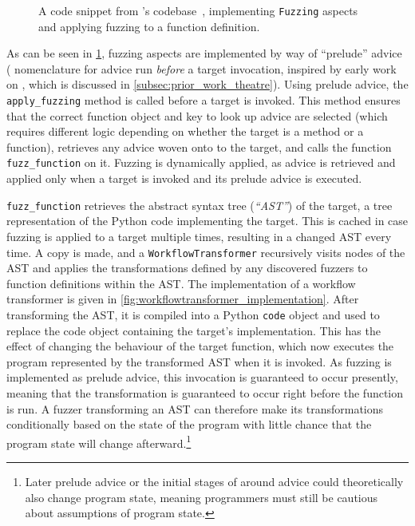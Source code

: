 \begin{figure}
    \centering
    
    \caption{A code snippet from \pydysofu's codebase~\cite{pdsf_repo},
    implementing \lstinline{Fuzzing} aspects and applying fuzzing to a function
    definition.}
    \label{fig:v1_pdsf_fuzzing_impl_codesnippet}
\end{figure}

As can be seen in \cref{fig:v1_pdsf_fuzzing_impl_codesnippet}, fuzzing aspects
are implemented by way of ``prelude'' advice (\pydysofu{} nomenclature for advice
run \emph{before} a target invocation, inspired by early work on \theatreag{},
which is discussed in \cref{subsec:prior_work_theatre}). Using prelude advice,
the \lstinline{apply_fuzzing} method is called before a target is invoked. This
method ensures that the correct function object and key to look up advice are
selected (which requires different logic depending on whether the target is a
method or a function), retrieves any advice woven onto to the target, and calls
the function \lstinline{fuzz_function} on it. Fuzzing is dynamically applied, as
advice is retrieved and applied only when a target is invoked and its prelude
advice is executed.

\lstinline{fuzz_function} retrieves the abstract syntax tree
(\emph{``AST''}) of the target, a tree representation of the Python code
implementing the target. This is cached in case fuzzing is applied to a target
multiple times, resulting in a changed AST every time. A copy is made, and a
\lstinline{WorkflowTransformer} recursively visits nodes of the AST and applies
the transformations defined by any discovered fuzzers to function definitions
within the AST. The implementation of a workflow transformer is given in
\cref{fig:workflowtransformer_implementation}. After transforming the AST, it is
compiled into a Python \lstinline{code} object and used to replace the code
object containing the target's implementation. This has the effect of changing
the behaviour of the target function, which now executes the program represented
by the transformed AST when it is invoked. As fuzzing is implemented as prelude
advice, this invocation is guaranteed to occur presently, meaning that the
transformation is guaranteed to occur right before the function is run. A fuzzer
transforming an AST can therefore make its transformations conditionally based
on the state of the program with little chance that the program state will
change afterward.\footnote{Later prelude advice or the initial stages of around
advice could theoretically also change program state, meaning programmers must
still be cautious about assumptions of program state.}

